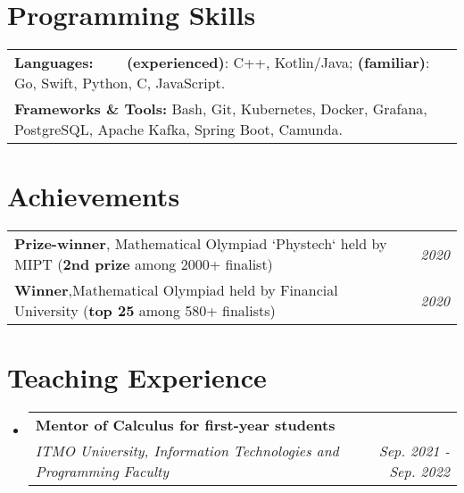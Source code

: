 \documentclass[letterpaper,10pt]{article}
\makeatletter
\newcommand{\resumeSubheading}[4]{
    \vspace{-1pt}\item
        \begin{tabular*}{0.97\textwidth}{l@{\extracolsep{\fill}}r}
            \textbf{#3} & \textcolor{mygray}{#2} \\
            \textit{\small#1} & \textcolor{mygray}{\textit{\small #4}} \\
        \end{tabular*}\vspace{-5pt}
}
\newcommand{\resumeSubHeadingListStart}{\begin{itemize}[leftmargin=*]}
\newcommand{\resumeSubHeadingListEnd}{\end{itemize}}
\makeatother
\begin{document}
\vspace{-1pt}

\section{Programming Skills}
    \resumeSubHeadingListStart
        \begin{tabular}{ll}
            \textbf{Languages:} \qquad\qquad\,\,\,\,\,\,\,\,\,\, \textbf{(experienced)}: C++, Kotlin/Java; \textbf{(familiar)}: Go, Swift, Python, C, JavaScript. \\
            \textbf{Frameworks \& Tools:} \quad Bash, Git, Kubernetes, Docker, Grafana, PostgreSQL, Apache Kafka, Spring Boot, Camunda.
        \end{tabular}
    \resumeSubHeadingListEnd


\vspace{-1pt}

\section{Achievements}
    \resumeSubHeadingListStart
        \begin{tabular}{ll}
            \textbf{Prize-winner}, \quad Mathematical Olympiad `Phystech` held by MIPT (\textbf{2nd prize} among 2000+ finalist) & \quad\quad\quad\quad\quad\quad\quad\quad \textit{\small 2020}\\
            \textbf{Winner},\quad\quad\quad\quad Mathematical Olympiad held by Financial University (\textbf{top 25} among 580+ finalists) & \quad\quad\quad\quad\quad\quad\quad\quad \textit{\small 2020} 
        \end{tabular}
    \resumeSubHeadingListEnd


\vspace{0.005pt}
\vspace{-1pt}

\section{Teaching Experience}
    \resumeSubHeadingListStart
        \resumeSubheading
            {ITMO University, Information Technologies and Programming Faculty}{}
            {Mentor of \textbf{Calculus} for first-year students}{Sep. 2021 - Sep. 2022}
  \resumeSubHeadingListEnd
\end{document}
